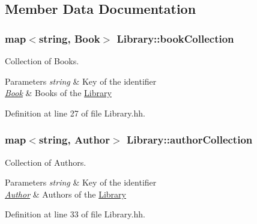 \subsection{Member Data Documentation}
\subsubsection[{\texorpdfstring{book\+Collection}{bookCollection}}]{\setlength{\rightskip}{0pt plus 5cm}map$<$string, {\bf Book}$>$ Library\+::book\+Collection\hspace{0.3cm}{\ttfamily [private]}}\hypertarget{class_library_a5807d6d006ac0aa0a184831f0f2e5415}{}\label{class_library_a5807d6d006ac0aa0a184831f0f2e5415}


Collection of Books. 


\begin{DoxyParams}{Parameters}
{\em string} & Key of the identifier \\
\hline
{\em \hyperlink{class_book}{Book}} & Books of the \hyperlink{class_library}{Library} \\
\hline
\end{DoxyParams}


Definition at line 27 of file Library.\+hh.

\subsubsection[{\texorpdfstring{author\+Collection}{authorCollection}}]{\setlength{\rightskip}{0pt plus 5cm}map$<$string, {\bf Author}$>$ Library\+::author\+Collection\hspace{0.3cm}{\ttfamily [private]}}\hypertarget{class_library_a7a6958a0dc85a1c816ca35727306cd62}{}\label{class_library_a7a6958a0dc85a1c816ca35727306cd62}


Collection of Authors. 


\begin{DoxyParams}{Parameters}
{\em string} & Key of the identifier \\
\hline
{\em \hyperlink{class_author}{Author}} & Authors of the \hyperlink{class_library}{Library} \\
\hline
\end{DoxyParams}


Definition at line 33 of file Library.\+hh.

